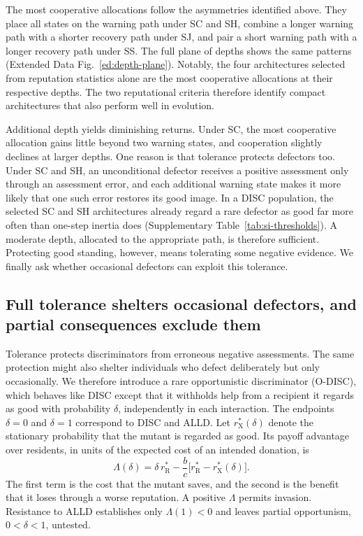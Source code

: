 \documentclass[10pt]{wlscirep}
\newcommand{\rR}{r_{\mathrm{R}}^{*}}
\newcommand{\rX}{r_{\mathrm{X}}^{*}}
\theoremstyle{plain}
\theoremstyle{remark}
\begin{document}
The most cooperative allocations follow the asymmetries identified above. They place all states on the warning path under SC and SH, combine a longer warning path with a shorter recovery path under SJ, and pair a short warning path with a longer recovery path under SS. The full plane of depths shows the same patterns (Extended Data Fig.~\ref{ed:depth-plane}). Notably, the four architectures selected from reputation statistics alone are the most cooperative allocations at their respective depths. The two reputational criteria therefore identify compact architectures that also perform well in evolution.

Additional depth yields diminishing returns. Under SC, the most cooperative allocation gains little beyond two warning states, and cooperation slightly declines at larger depths. One reason is that tolerance protects defectors too. Under SC and SH, an unconditional defector receives a positive assessment only through an assessment error, and each additional warning state makes it more likely that one such error restores its good image. In a DISC population, the selected SC and SH architectures already regard a rare defector as good far more often than one-step inertia does (Supplementary Table~\ref{tab:si-thresholds}). A moderate depth, allocated to the appropriate path, is therefore sufficient. Protecting good standing, however, means tolerating some negative evidence. We finally ask whether occasional defectors can exploit this tolerance.

\subsection*{Full tolerance shelters occasional defectors, and partial consequences exclude them}

Tolerance protects discriminators from erroneous negative assessments. The same protection might also shelter individuals who defect deliberately but only occasionally. We therefore introduce a rare opportunistic discriminator (O-DISC), which behaves like DISC except that it withholds help from a recipient it regards as good with probability $\delta$, independently in each interaction. The endpoints $\delta=0$ and $\delta=1$ correspond to DISC and ALLD. Let $\rX(\delta)$ denote the stationary probability that the mutant is regarded as good. Its payoff advantage over residents, in units of the expected cost of an intended donation, is
\begin{equation}
\Lambda(\delta)=\delta\,\rR-\frac{b}{c}\bigl[\rR-\rX(\delta)\bigr].
\label{eq:lambda}
\end{equation}
The first term is the cost that the mutant saves, and the second is the benefit that it loses through a worse reputation. A positive $\Lambda$ permits invasion. Resistance to ALLD establishes only $\Lambda(1)<0$ and leaves partial opportunism, $0<\delta<1$, untested.
\end{document}
